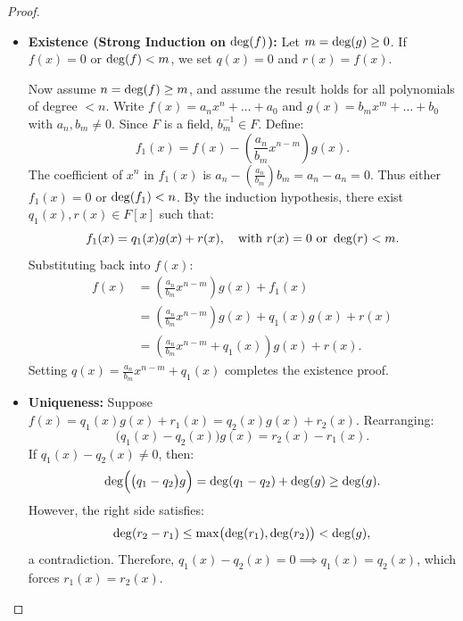 \begin{proof}
\begin{itemize}[leftmargin=1.5em, itemsep=6pt]
    \item \textbf{Existence (Strong Induction on $\operatorname{deg}(f)$):}
    Let $m = \operatorname{deg}(g) \ge 0$.
    If $f(x) = 0$ or $\operatorname{deg}(f) < m$, we set $q(x) = 0$ and $r(x) = f(x)$.
    
    Now assume $n = \operatorname{deg}(f) \ge m$, and assume the result holds for all polynomials of degree $< n$.
    Write $f(x) = a_n x^n + \dots + a_0$ and $g(x) = b_m x^m + \dots + b_0$ with $a_n, b_m \ne 0$.
    Since $F$ is a field, $b_m^{-1} \in F$.
    Define:
    \begin{equation*}
    f_1(x) = f(x) - \left( \frac{a_n}{b_m} x^{n-m} \right) g(x).
    \end{equation*}
    The coefficient of $x^n$ in $f_1(x)$ is $a_n - \left(\frac{a_n}{b_m}\right) b_m = a_n - a_n = 0$.
    Thus either $f_1(x) = 0$ or $\operatorname{deg}(f_1) < n$.
    By the induction hypothesis, there exist $q_1(x), r(x) \in F[x]$ such that:
    \begin{equation*}
    f_1(x) = q_1(x)g(x) + r(x), \quad \text{with } r(x) = 0 \text{ or } \operatorname{deg}(r) < m.
    \end{equation*}
    Substituting back into $f(x)$:
    \begin{align*}
    f(x) &= \left( \frac{a_n}{b_m} x^{n-m} \right) g(x) + f_1(x) \\
    &= \left( \frac{a_n}{b_m} x^{n-m} \right) g(x) + q_1(x)g(x) + r(x) \\
    &= \left( \frac{a_n}{b_m} x^{n-m} + q_1(x) \right) g(x) + r(x).
    \end{align*}
    Setting $q(x) = \frac{a_n}{b_m} x^{n-m} + q_1(x)$ completes the existence proof.

    \item \textbf{Uniqueness:}
    Suppose $f(x) = q_1(x)g(x) + r_1(x) = q_2(x)g(x) + r_2(x)$.
    Rearranging:
    \begin{equation*}
    \bigl(q_1(x) - q_2(x)\bigr) g(x) = r_2(x) - r_1(x).
    \end{equation*}
    If $q_1(x) - q_2(x) \ne 0$, then:
    \begin{equation*}
    \operatorname{deg}\Bigl(\bigl(q_1 - q_2\bigr)g\Bigr) = \operatorname{deg}(q_1 - q_2) + \operatorname{deg}(g) \ge \operatorname{deg}(g).
    \end{equation*}
    However, the right side satisfies:
    \begin{equation*}
    \operatorname{deg}(r_2 - r_1) \le \max\bigl(\operatorname{deg}(r_1), \operatorname{deg}(r_2)\bigr) < \operatorname{deg}(g),
    \end{equation*}
    a contradiction.
    Therefore, $q_1(x) - q_2(x) = 0 \implies q_1(x) = q_2(x)$, which forces $r_1(x) = r_2(x)$.
\end{itemize}
\end{proof}

